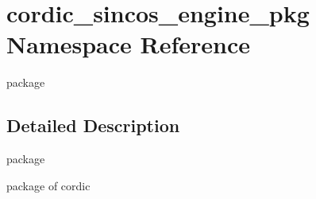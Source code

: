 \hypertarget{namespacecordic__sincos__engine__pkg}{}\section{cordic\+\_\+sincos\+\_\+engine\+\_\+pkg Namespace Reference}
\label{namespacecordic__sincos__engine__pkg}


package  




\subsection{Detailed Description}
package 

package of cordic 